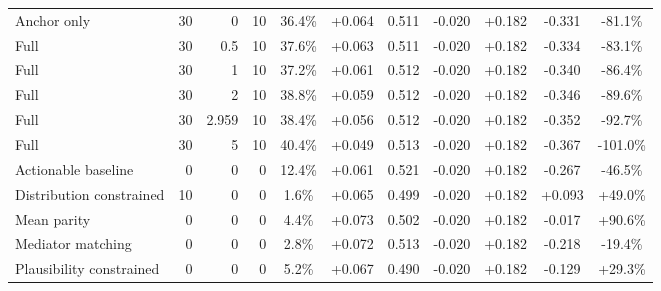 \begin{table}[htbp]
\begin{tabular}{lrrrccccccc}
Anchor only & 30 & 0 & 10 & 36.4\% & +0.064 & 0.511 & -0.020 & +0.182 & -0.331 & -81.1\% \\
Full & 30 & 0.5 & 10 & 37.6\% & +0.063 & 0.511 & -0.020 & +0.182 & -0.334 & -83.1\% \\
Full & 30 & 1 & 10 & 37.2\% & +0.061 & 0.512 & -0.020 & +0.182 & -0.340 & -86.4\% \\
Full & 30 & 2 & 10 & 38.8\% & +0.059 & 0.512 & -0.020 & +0.182 & -0.346 & -89.6\% \\
Full & 30 & 2.959 & 10 & 38.4\% & +0.056 & 0.512 & -0.020 & +0.182 & -0.352 & -92.7\% \\
Full & 30 & 5 & 10 & 40.4\% & +0.049 & 0.513 & -0.020 & +0.182 & -0.367 & -101.0\% \\
Actionable baseline & 0 & 0 & 0 & 12.4\% & +0.061 & 0.521 & -0.020 & +0.182 & -0.267 & -46.5\% \\
Distribution constrained & 10 & 0 & 0 & 1.6\% & +0.065 & 0.499 & -0.020 & +0.182 & +0.093 & +49.0\% \\
Mean parity & 0 & 0 & 0 & 4.4\% & +0.073 & 0.502 & -0.020 & +0.182 & -0.017 & +90.6\% \\
Mediator matching & 0 & 0 & 0 & 2.8\% & +0.072 & 0.513 & -0.020 & +0.182 & -0.218 & -19.4\% \\
Plausibility constrained & 0 & 0 & 0 & 5.2\% & +0.067 & 0.490 & -0.020 & +0.182 & -0.129 & +29.3\% \\
\bottomrule
\end{tabular}
\end{table}